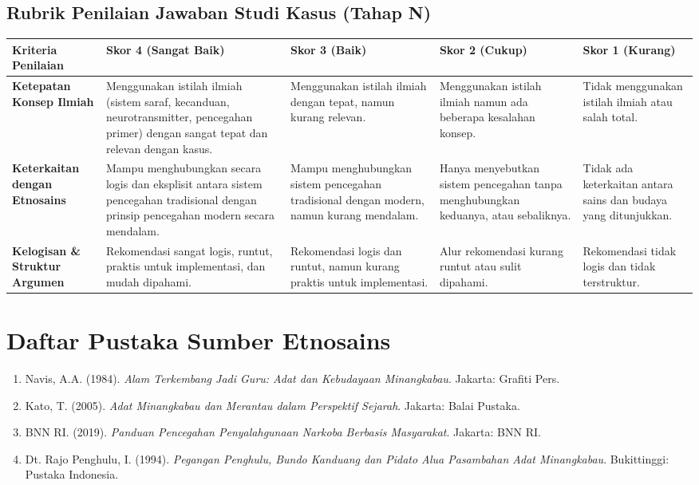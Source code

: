 \documentclass[a4paper,12pt]{article}
\begin{document}
\subsection{Rubrik Penilaian Jawaban Studi Kasus (Tahap N)}

\begin{longtable}{|p{3cm}|p{3cm}|p{3cm}|p{3cm}|p{3cm}|}
\hline
\textbf{Kriteria Penilaian} & \textbf{Skor 4 (Sangat Baik)} & \textbf{Skor 3 (Baik)} & \textbf{Skor 2 (Cukup)} & \textbf{Skor 1 (Kurang)} \\
\hline
\textbf{Ketepatan Konsep Ilmiah} & Menggunakan istilah ilmiah (sistem saraf, kecanduan, neurotransmitter, pencegahan primer) dengan sangat tepat dan relevan dengan kasus. & Menggunakan istilah ilmiah dengan tepat, namun kurang relevan. & Menggunakan istilah ilmiah namun ada beberapa kesalahan konsep. & Tidak menggunakan istilah ilmiah atau salah total. \\
\hline
\textbf{Keterkaitan dengan Etnosains} & Mampu menghubungkan secara logis dan eksplisit antara sistem pencegahan tradisional dengan prinsip pencegahan modern secara mendalam. & Mampu menghubungkan sistem pencegahan tradisional dengan modern, namun kurang mendalam. & Hanya menyebutkan sistem pencegahan tanpa menghubungkan keduanya, atau sebaliknya. & Tidak ada keterkaitan antara sains dan budaya yang ditunjukkan. \\
\hline
\textbf{Kelogisan \& Struktur Argumen} & Rekomendasi sangat logis, runtut, praktis untuk implementasi, dan mudah dipahami. & Rekomendasi logis dan runtut, namun kurang praktis untuk implementasi. & Alur rekomendasi kurang runtut atau sulit dipahami. & Rekomendasi tidak logis dan tidak terstruktur. \\
\hline
\end{longtable}

\section{Daftar Pustaka Sumber Etnosains}

\begin{enumerate}
\item Navis, A.A. (1984). \textit{Alam Terkembang Jadi Guru: Adat dan Kebudayaan Minangkabau}. Jakarta: Grafiti Pers.
\item Kato, T. (2005). \textit{Adat Minangkabau dan Merantau dalam Perspektif Sejarah}. Jakarta: Balai Pustaka.
\item BNN RI. (2019). \textit{Panduan Pencegahan Penyalahgunaan Narkoba Berbasis Masyarakat}. Jakarta: BNN RI.
\item Dt. Rajo Penghulu, I. (1994). \textit{Pegangan Penghulu, Bundo Kanduang dan Pidato Alua Pasambahan Adat Minangkabau}. Bukittinggi: Pustaka Indonesia.
\end{enumerate}
\end{document}
